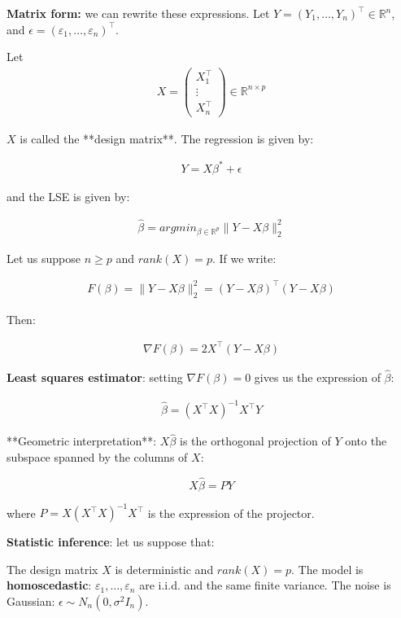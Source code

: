 \textbf{Matrix form:} we can rewrite these expressions. Let $Y = (Y_1, \ldots, Y_n)^\top \in \mathbb{R}^n$, and $\epsilon = (\varepsilon_1, \ldots, \varepsilon_n)^\top$. 

Let
\begin{align*}
X = \begin{pmatrix} X_1^\top \\ \vdots \\ X_n^\top \end{pmatrix} \in \mathbb{R}^{n \times p}
\end{align*}

$X$ is called the **design matrix**. The regression is given by:

\begin{align*}
Y = X\beta^{*} + \epsilon
\end{align*}

and the LSE is given by:

\begin{align*}
\hat{\beta} = argmin_{\beta \in \mathbb{R}^p} \|Y - X\beta\|^2_2
\end{align*}


Let us suppose $n \geq p$ and $rank(X) = p$. If we write:

\begin{align*}
F(\beta)  = \|Y - X\beta\|^2_2 = (Y - X\beta)^\top(Y - X\beta)
\end{align*}


Then:

\begin{align*}
\nabla F(\beta) = 2 X^\top(Y - X\beta)
\end{align*}


\textbf{Least squares estimator}: setting $\nabla F(\beta) = 0$ gives us the expression of $\hat{\beta}$:

\begin{align*}
\hat{\beta} = (X^\top X)^{-1}X^\top Y
\end{align*}


**Geometric interpretation**: $X\hat{\beta}$ is the orthogonal projection of $Y$ onto the subspace spanned by the columns of $X$:

$$ X\hat{\beta} = PY$$

where $P = X(X^\top X)^{-1}X^\top$ is the expression of the projector.

\textbf{Statistic inference}: let us suppose that:

 The design matrix $X$ is deterministic and $rank(X) = p$.
 The model is \textbf{homoscedastic}: $\varepsilon_1, \ldots, \varepsilon_n$ are i.i.d.
 and the same finite variance.
 The noise is Gaussian: $\epsilon \sim N_n(0, \sigma^2I_n)$.

